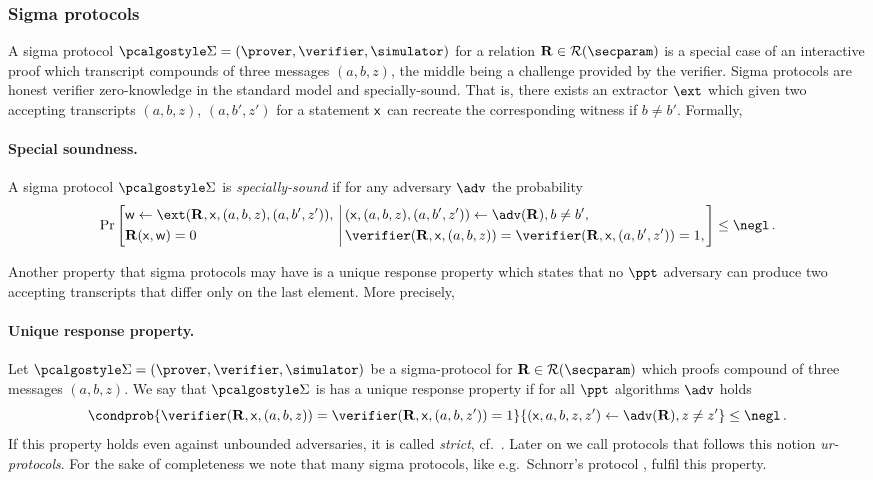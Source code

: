 \documentclass[runningheads,11pt]{llncs}
\begin{document}
\subsubsection{Sigma protocols}
A sigma protocol $\sigmaprot = (\prover, \verifier, \simulator)$ for a relation
$\REL \in \RELGEN(\secparam)$ is a special case of an interactive proof which
transcript compounds of three messages $(a, b, z)$, the middle being a challenge
provided by the verifier. Sigma protocols are honest verifier zero-knowledge in
the standard model and specially-sound. That is, there exists an extractor
$\ext$ which given two accepting transcripts $(a, b, z)$, $(a, b', z')$ for a
statement $\mathsf{x}$ can recreate the corresponding witness if $b \neq b'$.
Formally,
\paragraph{Special soundness.} A sigma protocol $\sigmaprot$ is \emph{specially-sound}
  if for any adversary $\adv$ the probability
	\[
		\Pr\left[
		\begin{aligned}
				& \wit \gets \ext(\REL, \inp, (a, b, z), (a, b', z')),\\
				& \REL(\inp, \wit) = 0
		\end{aligned}
		\,\left|\,
		\begin{aligned}
          & (\inp, (a, b, z), (a, b', z')) \gets \adv(\REL), %
           b \neq b',  \\
          & \verifier(\REL, \inp, (a, b, z)) = %
            \verifier(\REL, \inp, (a, b', z')) = 1, \\
		\end{aligned}
		\right.\right] \leq  \negl\,.
	\]

Another property that sigma protocols may have is a unique response
property \cite{C:Fischlin05} which states that no $\ppt$ adversary can
produce two accepting transcripts that differ only on the last
element. More precisely, 
\paragraph{Unique response property.} Let
$\sigmaprot = (\prover, \verifier, \simulator)$ be a sigma-protocol for
$\REL \in \RELGEN(\secparam)$ which proofs compound of three messages
$(a, b, z)$. We say that $\sigmaprot$ is has a unique response property if for
all $\ppt$ algorithms $\adv$ holds
\[ \condprob{\verifier (\REL, \inp, (a, b, z)) = \verifier (\REL, \inp, (a, b,
    z')) = 1}{(\inp, a, b, z, z') \gets \adv(\REL), z \neq z'} \leq \negl\,.  \]
If this property holds even against unbounded adversaries, it is called
\emph{strict}, cf.~\cite{INDOCRYPT:FKMV12}. Later on we call protocols that
follows this notion \emph{ur-protocols}. For the sake of completeness we note
that many sigma protocols, like e.g.~Schnorr's protocol \cite{C:Schnorr89},
fulfil this property.
\end{document}
